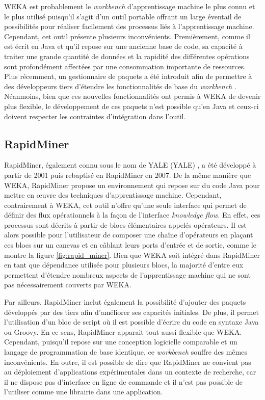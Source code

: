 \acs{WEKA} est probablement le \textit{workbench} d'apprentissage machine le plus connu et le plus utilisé puisqu'il s'agit d'un outil portable \citep{Bouckaert2010} offrant un large éventail de possibilités pour réaliser facilement des processus liés à l'apprentissage machine. Cependant, cet outil présente plusieurs inconvénients. Premièrement, comme il est écrit en Java et qu'il repose sur une ancienne base de code, sa capacité à traiter une grande quantité de données et la rapidité des différentes opérations sont profondément affectées par une consommation importante de ressources. Plus récemment, un gestionnaire de paquets a été introduit afin de permettre à des développeurs tiers d'étendre les fonctionnalités de base du \textit{workbench} \citep{Hall2009}. Néanmoins, bien que ces nouvelles fonctionnalités ont permis à \acs{WEKA} de devenir plus flexible, le développement de ces paquets n'est possible qu'en Java et ceux-ci doivent respecter les contraintes d'intégration dans l'outil.

\subsection{RapidMiner}

RapidMiner, également connu sous le nom de \acs{YALE} (\acl{YALE}) \citep{Ritthoo2003,Hofmann2014}, a été développé à partir de 2001 puis rebaptisé en RapidMiner en 2007.  De la même manière que \acs{WEKA}, RapidMiner propose un environnement qui repose sur du code Java pour mettre en \oe{}uvre des techniques d'apprentissage machine. Cependant, contrairement à \acs{WEKA}, cet outil n'offre qu'une seule interface qui permet de définir des flux opérationnels à la façon de l'interface \textit{knowledge flow}. En effet, ces processus sont décrits à partir de blocs élémentaires appelés opérateurs. Il est alors possible pour l'utilisateur de composer une chaîne d'opérateurs en plaçant ces blocs sur un canevas et en câblant leurs ports d'entrée et de sortie, comme le montre la figure \ref{fig:rapid_miner}. Bien que \acs{WEKA} soit intégré dans RapidMiner en tant que dépendance utilisée pour plusieurs blocs, la majorité d'entre eux permettent d'étendre nombreux aspects de l'apprentissage machine qui ne sont pas nécessairement couverts par \acs{WEKA}.

Par ailleurs, RapidMiner inclut également la possibilité d'ajouter des paquets développés par des tiers afin d'améliorer ses capacités initiales. De plus, il permet l'utilisation d'un bloc de script où il est possible d'écrire du code en syntaxe Java ou Groovy. En ce sens, RapidMiner apparait tout aussi flexible que \acs{WEKA}. Cependant, puisqu'il repose sur une conception logicielle comparable et un langage de programmation de base identique, ce \textit{workbench} souffre des mêmes inconvénients. En outre, il est possible de dire que RapidMiner ne convient pas au déploiement d'applications expérimentales dans un contexte de recherche, car il ne dispose pas d'interface en ligne de commande et il n'est pas possible de l'utiliser comme une librairie dans une application.

